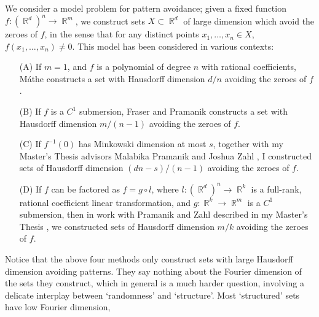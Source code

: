 \documentclass[11pt]{article}
\DeclareMathOperator{\RR}{\mathbb{R}}
\begin{document}
We consider a model problem for pattern avoidance; given a fixed function $f: (\RR^d)^n \to \RR^m$, we construct sets $X \subset \RR^d$ of large dimension which avoid the zeroes of $f$, in the sense that for any distinct points $x_1,\dots,x_n \in X$, $f(x_1,\dots,x_n) \neq 0$. 
This model has been considered in various contexts:
%
\begin{itemize}
	\item[(A)] If $m = 1$, and $f$ is a polynomial of degree $n$ with rational coefficients, M\'{a}the \cite{Mathe} constructs a set with Hausdorff dimension $d/n$ avoiding the zeroes of $f$.

	\item[(B)] If $f$ is a $C^1$ submersion, Fraser and Pramanik \cite{FraserPramanik} constructs a set with Hausdorff dimension $m/(n-1)$ avoiding the zeroes of $f$. 

	\item[(C)] If $f^{-1}(0)$ has Minkowski dimension at most $s$, together with my Master's Thesis advisors Malabika Pramanik and Joshua Zahl \cite{DensonPramanikZahl}, I constructed sets of Hausdorff dimension $(dn - s)/(n-1)$ avoiding the zeroes of $f$.

	\item[(D)] If $f$ can be factored as $f = g \circ l$, where $l: (\RR^d)^n \to \RR^k$ is a full-rank, rational coefficient linear transformation, and $g: \RR^k \to \RR^m$ is a $C^1$ submersion, then in work with Pramanik and Zahl described in my Master's Thesis \cite{DensonCharacterization}, we constructed sets of Hausdorff dimension $m/k$ avoiding the zeroes of $f$.
\end{itemize}
%
Notice that the above four methods only construct sets with large Hausdorff dimension avoiding patterns. They say nothing about the Fourier dimension of the sets they construct, which in general is a much harder question, involving a delicate interplay between `randomness' and `structure'. Most `structured' sets have low Fourier dimension, %
\end{document}

